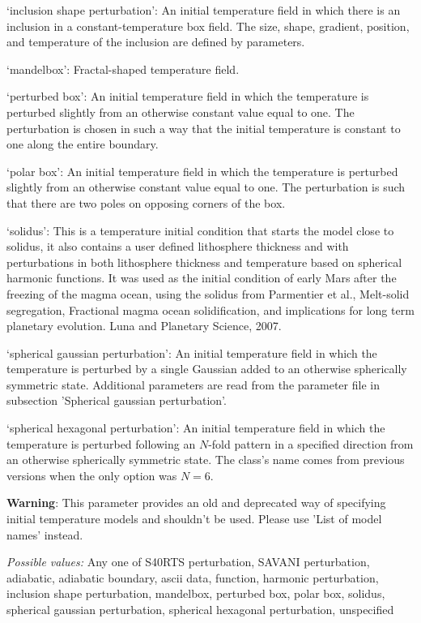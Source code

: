 \begin{itemize}
`inclusion shape perturbation': An initial temperature field in which there is an inclusion in a constant-temperature box field. The size, shape, gradient, position, and temperature of the inclusion are defined by parameters.

`mandelbox': Fractal-shaped temperature field.

`perturbed box': An initial temperature field in which the temperature is perturbed slightly from an otherwise constant value equal to one. The perturbation is chosen in such a way that the initial temperature is constant to one along the entire boundary.

`polar box': An initial temperature field in which the temperature is perturbed slightly from an otherwise constant value equal to one. The perturbation is such that there are two poles on opposing corners of the box. 

`solidus': This is a temperature initial condition that starts the model close to solidus, it also contains a user defined lithosphere thickness and with perturbations  in both lithosphere thickness and temperature based on spherical harmonic functions. It was used as the initial condition of early Mars after the freezing of the magma ocean, using the solidus from Parmentier et al., Melt-solid segregation, Fractional magma ocean solidification, and implications for long term planetary evolution. Luna and Planetary Science, 2007.

`spherical gaussian perturbation': An initial temperature field in which the temperature is perturbed by a single Gaussian added to an otherwise spherically symmetric state. Additional parameters are read from the parameter file in subsection 'Spherical gaussian perturbation'.

`spherical hexagonal perturbation': An initial temperature field in which the temperature is perturbed following an $N$-fold pattern in a specified direction from an otherwise spherically symmetric state. The class's name comes from previous versions when the only option was $N=6$.

\textbf{Warning}: This parameter provides an old and deprecated way of specifying initial temperature models and shouldn't be used. Please use 'List of model names' instead.


{\it Possible values:} Any one of S40RTS perturbation, SAVANI perturbation, adiabatic, adiabatic boundary, ascii data, function, harmonic perturbation, inclusion shape perturbation, mandelbox, perturbed box, polar box, solidus, spherical gaussian perturbation, spherical hexagonal perturbation, unspecified
\end{itemize}



